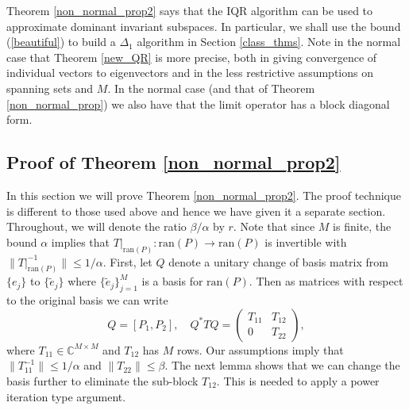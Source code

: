 \documentclass[a4paper,10pt]{article}
\begin{document}
\begin{remark}
Theorem \ref{non_normal_prop2} says that the IQR algorithm can be used to approximate dominant invariant subspaces. In particular, we shall use the bound (\ref{beautiful}) to build a $\Delta_1$ algorithm in Section \ref{class_thms}. Note in the normal case that Theorem \ref{new_QR} is more precise, both in giving convergence of individual vectors to eigenvectors and in the less restrictive assumptions on spanning sets and $M$. In the normal case (and that of Theorem \ref{non_normal_prop}) we also have that the limit operator has a block diagonal form.
\end{remark}

\subsection{Proof of Theorem \ref{non_normal_prop2}}

In this section we will prove Theorem \ref{non_normal_prop2}. The proof technique is different to those used above and hence we have given it a separate section. Throughout, we will denote the ratio $\beta/\alpha$ by $r$. Note that since $M$ is finite, the bound $\alpha$ implies that $T|_{\mathrm{ran}(P)}:\mathrm{ran}(P)\rightarrow\mathrm{ran}(P)$ is invertible with $\|T|_{\mathrm{ran}(P)}^{-1}\|\leq 1/\alpha$. First, let $Q$ denote a unitary change of basis matrix from $\{e_j\}$ to $\{\tilde e_j\}$ where $\{\tilde e_j\}_{j=1}^M$ is a basis for $\mathrm{ran}(P)$. Then as matrices with respect to the original basis we can write
$$
Q=[P_1,P_2],\quad Q^* TQ=
\left(\begin{matrix}
T_{11}      & T_{12} \\
0  & T_{22}
\end{matrix}\right),
$$ 
where $T_{11}\in\mathbb{C}^{M\times M}$ and $T_{12}$ has $M$ rows. Our assumptions imply that $\|T_{11}^{-1}\|\leq 1/\alpha$ and $\|T_{22}\|\leq \beta$. The next lemma shows that we can change the basis further to eliminate the sub-block $T_{12}$. This is needed to apply a power iteration type argument.
\end{document}
